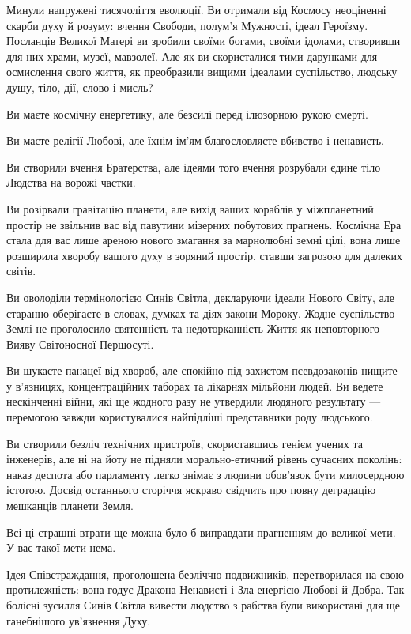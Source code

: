 Минули напружені тисячоліття еволюції. Ви отримали від Космосу неоціненні
скарби духу й розуму: вчення Свободи, полум’я Мужності, ідеал Героїзму.
Посланців Великої Матері ви зробили своїми богами, своїми ідолами, створивши
для них храми, музеї, мавзолеї. Але як ви скористалися тими дарунками для
осмислення свого життя, як преобразили вищими ідеалами суспільство, людську
душу, тіло, дії, слово і мисль?

Ви маєте космічну енергетику, але безсилі перед ілюзорною рукою смерті.

Ви маєте релігії Любові, але їхнім ім’ям благословляєте вбивство і ненависть.

Ви створили вчення Братерства, але ідеями того вчення розрубали єдине тіло
Людства на ворожі частки.

Ви розірвали гравітацію планети, але вихід ваших кораблів у міжпланетний
простір не звільнив вас від павутини мізерних побутових прагнень. Космічна Ера
стала для вас лише ареною нового змагання за марнолюбні земні цілі, вона лише
розширила хворобу вашого духу в зоряний простір, ставши загрозою для далеких
світів.

Ви оволоділи термінологією Синів Світла, декларуючи ідеали Нового Світу, але
старанно оберігаєте в словах, думках та діях закони Мороку. Жодне суспільство
Землі не проголосило святенність та недоторканність Життя як неповторного Вияву
Світоносної Першосуті.

Ви шукаєте панацеї від хвороб, але спокійно під захистом псевдозаконів нищите у
в’язницях, концентраційних таборах та лікарнях мільйони людей. Ви ведете
нескінченні війни, які ще жодного разу не утвердили людяного результату —
перемогою завжди користувалися найпідліші представники роду людського.

Ви створили безліч технічних пристроїв, скориставшись генієм учених та
інженерів, але ні на йоту не підняли морально-етичний рівень сучасних поколінь:
наказ деспота або парламенту легко знімає з людини обов’язок бути милосердною
істотою. Досвід останнього сторіччя яскраво свідчить про повну деградацію
мешканців планети Земля.

Всі ці страшні втрати ще можна було б виправдати прагненням до великої мети. У
вас такої мети нема.

Ідея Співстраждання, проголошена безліччю подвижників, перетворилася на свою
протилежність: вона годує Дракона Ненависті і Зла енергією Любові й Добра. Так
болісні зусилля Синів Світла вивести людство з рабства були використані для ще
ганебнішого ув’язнення Духу.

